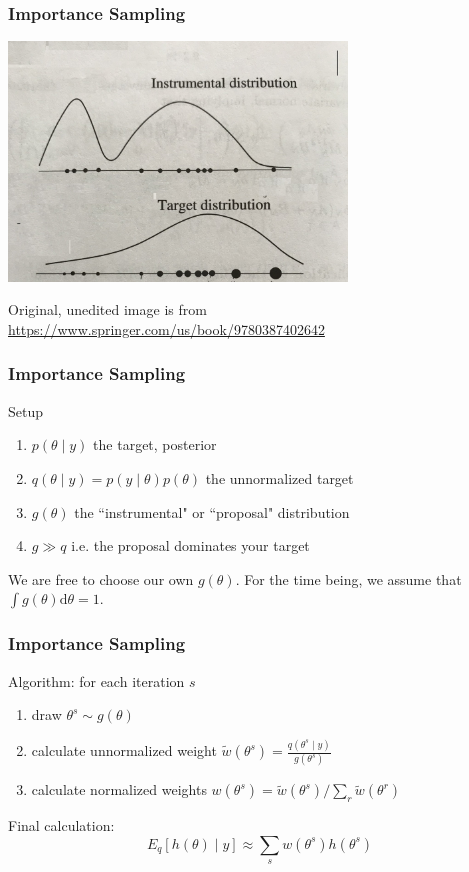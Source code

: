 \documentclass{beamer}
\begin{document}
\begin{frame}[fragile]
\frametitle{Importance Sampling}

\begin{center}
\includegraphics[width=90mm]{is.jpg}
\end{center}
Original, unedited image is from \url{https://www.springer.com/us/book/9780387402642}

\end{frame}
\begin{frame}[fragile]
\frametitle{Importance Sampling}

Setup
\begin{enumerate}
\item $p(\theta \mid y)$ the target, posterior
\item $q(\theta \mid y) = p(y \mid \theta) p(\theta)$ the unnormalized target
\item $g(\theta)$ the ``instrumental" or ``proposal" distribution
\item $g \gg q$ i.e. the proposal dominates your target 
\end{enumerate}
We are free to choose our own $g(\theta)$. For the time being, we assume that $\int g(\theta) \text{d}\theta = 1$.


\end{frame}


\begin{frame}[fragile]
\frametitle{Importance Sampling}

Algorithm: for each iteration $s$
\begin{enumerate}
\item draw $\theta^s \sim g(\theta)$
\item calculate unnormalized weight $\tilde{w}(\theta^s) = \frac{q(\theta^s \mid y)}{g(\theta^s)}$
\item calculate normalized weights $w(\theta^s) = \tilde{w}(\theta^s)/\sum_r \tilde{w}(\theta^r)$
\end{enumerate}
Final calculation: 
$$
E_q[h(\theta) \mid y] \approx \sum_s w(\theta^s) h(\theta^s)
$$
\end{frame}
\end{document}
